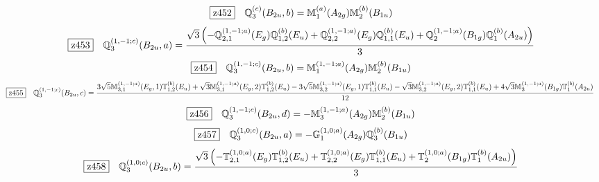 \documentclass[fleqn,10pt,landscape]{jsarticle}
\begin{document}
\begin{dmath*}
\hspace*{3mm}\fbox{z452}\quad \mathbb{Q}_{3}^{(c)}(B_{2u},b)=\mathbb{M}_{1}^{(a)}(A_{2g}) \mathbb{M}_{2}^{(b)}(B_{1u})
\end{dmath*}
\begin{dmath*}
\hspace*{3mm}\fbox{z453}\quad \mathbb{Q}_{3}^{(1,-1;c)}(B_{2u},a)=\frac{\sqrt{3} \left(- \mathbb{Q}_{2,1}^{(1,-1;a)}(E_{g}) \mathbb{Q}_{1,2}^{(b)}(E_{u}) + \mathbb{Q}_{2,2}^{(1,-1;a)}(E_{g}) \mathbb{Q}_{1,1}^{(b)}(E_{u}) + \mathbb{Q}_{2}^{(1,-1;a)}(B_{1g}) \mathbb{Q}_{1}^{(b)}(A_{2u})\right)}{3}
\end{dmath*}
\begin{dmath*}
\hspace*{3mm}\fbox{z454}\quad \mathbb{Q}_{3}^{(1,-1;c)}(B_{2u},b)=\mathbb{M}_{1}^{(1,-1;a)}(A_{2g}) \mathbb{M}_{2}^{(b)}(B_{1u})
\end{dmath*}
\begin{dmath*}
\hspace*{3mm}\fbox{z455}\quad \mathbb{Q}_{3}^{(1,-1;c)}(B_{2u},c)=\frac{3 \sqrt{5} \mathbb{M}_{3,1}^{(1,-1;a)}(E_{g},1) \mathbb{T}_{1,2}^{(b)}(E_{u}) + \sqrt{3} \mathbb{M}_{3,1}^{(1,-1;a)}(E_{g},2) \mathbb{T}_{1,2}^{(b)}(E_{u}) - 3 \sqrt{5} \mathbb{M}_{3,2}^{(1,-1;a)}(E_{g},1) \mathbb{T}_{1,1}^{(b)}(E_{u}) - \sqrt{3} \mathbb{M}_{3,2}^{(1,-1;a)}(E_{g},2) \mathbb{T}_{1,1}^{(b)}(E_{u}) + 4 \sqrt{3} \mathbb{M}_{3}^{(1,-1;a)}(B_{1g}) \mathbb{T}_{1}^{(b)}(A_{2u})}{12}
\end{dmath*}
\begin{dmath*}
\hspace*{3mm}\fbox{z456}\quad \mathbb{Q}_{3}^{(1,-1;c)}(B_{2u},d)=- \mathbb{M}_{3}^{(1,-1;a)}(A_{2g}) \mathbb{M}_{2}^{(b)}(B_{1u})
\end{dmath*}
\begin{dmath*}
\hspace*{3mm}\fbox{z457}\quad \mathbb{Q}_{3}^{(1,0;c)}(B_{2u},a)=- \mathbb{G}_{1}^{(1,0;a)}(A_{2g}) \mathbb{Q}_{3}^{(b)}(B_{1u})
\end{dmath*}
\begin{dmath*}
\hspace*{3mm}\fbox{z458}\quad \mathbb{Q}_{3}^{(1,0;c)}(B_{2u},b)=\frac{\sqrt{3} \left(- \mathbb{T}_{2,1}^{(1,0;a)}(E_{g}) \mathbb{T}_{1,2}^{(b)}(E_{u}) + \mathbb{T}_{2,2}^{(1,0;a)}(E_{g}) \mathbb{T}_{1,1}^{(b)}(E_{u}) + \mathbb{T}_{2}^{(1,0;a)}(B_{1g}) \mathbb{T}_{1}^{(b)}(A_{2u})\right)}{3}
\end{dmath*}
\end{document}

